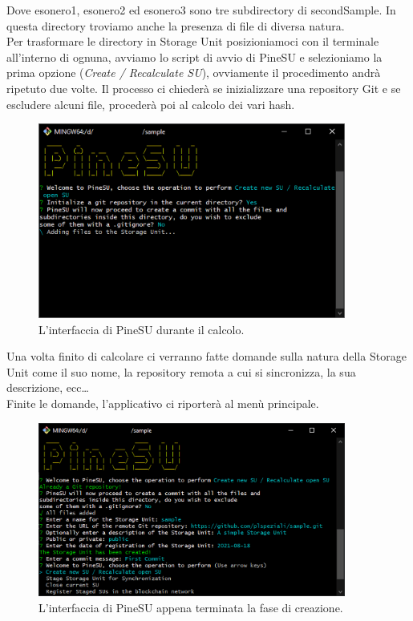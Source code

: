 Dove \textsf{esonero1}, \textsf{esonero2} ed \textsf{esonero3} sono tre subdirectory di \textsf{secondSample}.
In questa directory troviamo anche la presenza di file di diversa natura. \\


Per trasformare le directory in Storage Unit posizioniamoci con il terminale all'interno di ognuna,
avviamo lo script di avvio di PineSU e selezioniamo la prima opzione (\emph{Create / Recalculate SU}),
ovviamente il procedimento andrà ripetuto due volte.
Il processo ci chiederà se inizializzare una repository Git e se escludere alcuni file,
procederà poi al calcolo dei vari hash.

\begin{figure}[H]
    \centering
    \includegraphics[width=0.9\textwidth]{Figures/calculating}
    \caption{\small{
    L'interfaccia di PineSU durante il calcolo.
    } %
    } %
    \label{fi:calc}
\end{figure}


Una volta finito di calcolare ci verranno fatte domande sulla natura della Storage Unit come il suo nome,
la repository remota a cui si sincronizza, la sua descrizione, ecc\dots \\
Finite le domande, l'applicativo ci riporterà al menù principale.

\begin{figure}[H]
    \centering
    \includegraphics[width=0.9\textwidth]{Figures/doneCalculating}
    \caption{\small{
    L'interfaccia di PineSU appena terminata la fase di creazione.
    } %
    } %
    \label{fi:dcalc}
\end{figure}


